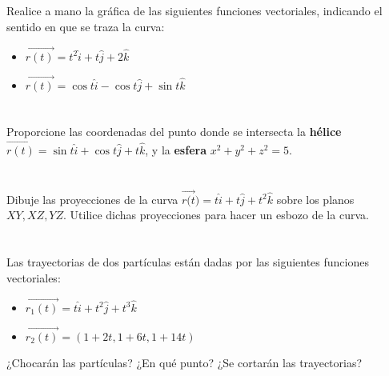 \documentclass[12pt]{article}
\begin{document}
\section{}
Realice a mano la gráfica de las siguientes funciones vectoriales, indicando el sentido en que se traza la curva:
\begin{itemize}[format=\textbf]

\item $\vec{r(t)} = t^2\hat{i}+t\hat{j}+2\hat{k}$

\item $\vec{r(t)} = \cos{t}\hat{i}-\cos{t}\hat{j}+\sin{t}\hat{k}$

\end{itemize}

\section{}
Proporcione las coordenadas del punto donde se intersecta la \textbf{hélice} $\vec{r(t)}=\sin{t}\hat{i}+\cos{t}\hat{j}+t\hat{k}$, y la \textbf{esfera} $x^2+y^2+z^2=5$.

\section{}
Dibuje las proyecciones de la curva $\vec{r(t})=t\hat{i}+t\hat{j}+t^2\hat{k}$ sobre los planos $XY , XZ, YZ$. Utilice dichas proyecciones para hacer un esbozo de la curva.

\section{}
Las trayectorias de dos partículas están dadas por las siguientes funciones vectoriales:
\begin{itemize}[format=\textbf]

\item $\vec{r_1(t)}=t\hat{i}+t^2\hat{j}+t^3\hat{k}$

\item $\vec{r_2(t)}=(1+2t,1+6t,1+14t)$

\end{itemize}
¿Chocarán las partículas? ¿En qué punto? ¿Se cortarán las trayectorias?
\end{document}
